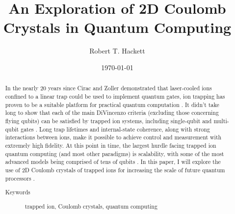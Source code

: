 \title{An Exploration of 2D Coulomb Crystals in Quantum Computing}%

\author{Robert T. Hackett}
%




\date{\today}%

\begin{abstract}
In the nearly 20 years since Cirac and Zoller demonstrated that laser-cooled ions confined to a linear trap could be used to implement quantum gates, ion trapping has proven to be a suitable platform for practical quantum computation \cite{Cirac}. It didn't take long to show that each of the main DiVincenzo criteria (excluding those concerning flying qubits) can be satisfied by trapped ion systems, including single-qubit and multi-qubit gates \cite{Bruzewicz}. Long trap lifetimes and internal-state coherence, along with strong interactions between ions, make it possible to achieve control and measurement with extremely high fidelity. At this point in time, the largest hurdle facing trapped ion quantum computing (and most other paradigms) is scalability, with some of the most advanced models being comprised of tens of qubits \cite{Moses}. In this paper, I will explore the use of 2D Coulomb crystals of trapped ions for increasing the scale of future quantum processors \cite{Kato, Kiesenhofer}.
\begin{description}
\item[Keywords]
trapped ion, Coulomb crystals, quantum computing
\end{description}
\end{abstract}

\maketitle
